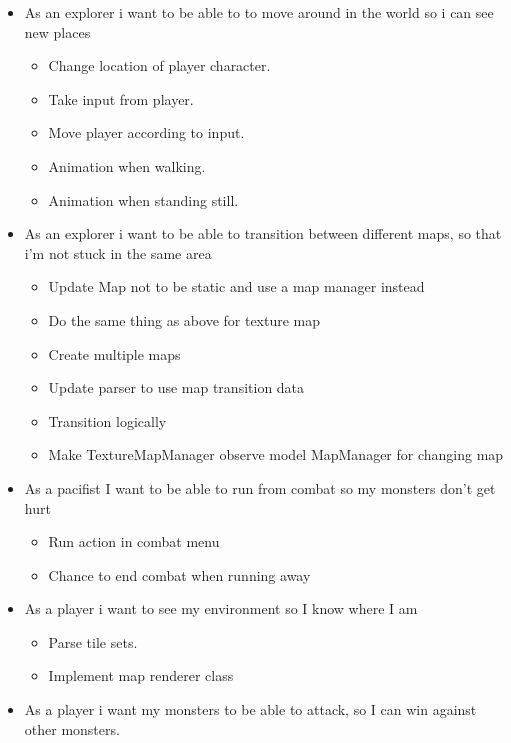 \begin{itemize}
	\item \D As an explorer i want to be able to to move around in the world so i can see new places
	      \begin{itemize}[+]
		      \item Change location of player character.
		      \item Take input from player.
		      \item Move player according to input.
		      \item Animation when walking.
		      \item Animation when standing still.
	      \end{itemize}
	\item \D As an explorer i want to be able to transition between different maps, so that i'm not stuck in the same area
	      \begin{itemize}[+]
		      \item Update Map not to be static and use a map manager instead
		      \item Do the same thing as above for texture map
		      \item Create multiple maps
		      \item Update parser to use map transition data
		      \item Transition logically
		      \item Make TextureMapManager observe model MapManager for changing map
	      \end{itemize}
	\item \D As a pacifist I want to be able to run from combat so my monsters don't get hurt
	      \begin{itemize}[+]
		      \item Run action in combat menu
		      \item Chance to end combat when running away
	      \end{itemize}
	\item \D As a player i want to see my environment so I know where I am
	      \begin{itemize}[+]
		      \item Parse tile sets.
		      \item Implement map renderer class
	      \end{itemize}
	\item \D As a player i want my monsters to be able to attack, so I can win against other monsters.
	      \begin{itemize}[+]

\end{itemize}
\end{itemize}
